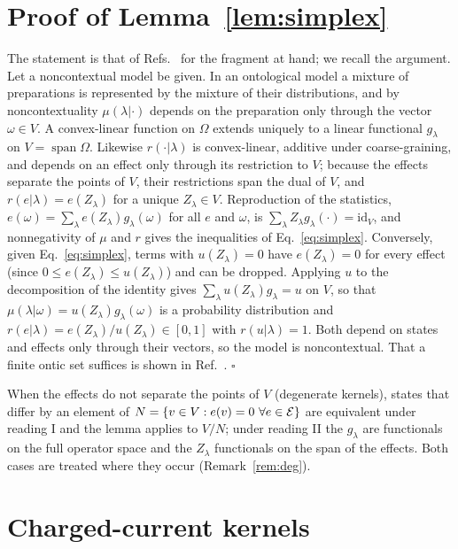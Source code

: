 \section{Proof of Lemma~\ref{lem:simplex}}
\label{app:lemma1}

The statement is that of Refs.~\cite{schmid2021,selby2024lp} for the fragment at hand; we recall the argument. Let a noncontextual model be given. In an ontological model a mixture of preparations is represented by the mixture of their distributions, and by noncontextuality $\mu(\lambda|\cdot)$ depends on the preparation only through the vector $\omega\in V$. A convex-linear function on $\Omega$ extends uniquely to a linear functional $g_\lambda$ on $V=\operatorname{span}\Omega$. Likewise $r(\cdot|\lambda)$ is convex-linear, additive under coarse-graining, and depends on an effect only through its restriction to $V$; because the effects separate the points of $V$, their restrictions span the dual of $V$, and $r(e|\lambda)=e(Z_\lambda)$ for a unique $Z_\lambda\in V$. Reproduction of the statistics, $e(\omega)=\sum_\lambda e(Z_\lambda)g_\lambda(\omega)$ for all $e$ and $\omega$, is $\sum_\lambda Z_\lambda g_\lambda(\cdot)=\mathrm{id}_V$, and nonnegativity of $\mu$ and $r$ gives the inequalities of Eq.~\eqref{eq:simplex}. Conversely, given Eq.~\eqref{eq:simplex}, terms with $u(Z_\lambda)=0$ have $e(Z_\lambda)=0$ for every effect (since $0\le e(Z_\lambda)\le u(Z_\lambda)$) and can be dropped. Applying $u$ to the decomposition of the identity gives $\sum_\lambda u(Z_\lambda)g_\lambda=u$ on $V$, so that $\mu(\lambda|\omega)=u(Z_\lambda)g_\lambda(\omega)$ is a probability distribution and $r(e|\lambda)=e(Z_\lambda)/u(Z_\lambda)\in[0,1]$ with $r(u|\lambda)=1$. Both depend on states and effects only through their vectors, so the model is noncontextual. That a finite ontic set suffices is shown in Ref.~\cite{schmid2021}. \hfill$\square$

When the effects do not separate the points of $V$ (degenerate kernels), states that differ by an element of $N=\{v\in V:e(v)=0\ \forall e\in\mathcal{E}\}$ are equivalent under reading I and the lemma applies to $V/N$; under reading II the $g_\lambda$ are functionals on the full operator space and the $Z_\lambda$ functionals on the span of the effects. Both cases are treated where they occur (Remark~\ref{rem:deg}).

\section{Charged-current kernels}
\label{app:va}

